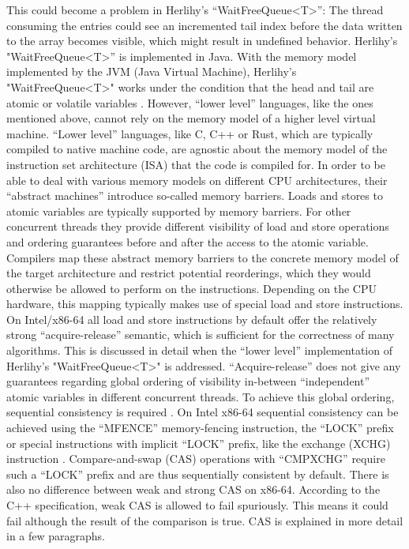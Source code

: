 This could become a problem in Herlihy’s “WaitFreeQueue<T>”: The thread consuming the entries could see an incremented tail index before the data written to the array becomes visible, which might result in undefined behavior.  \newline
Herlihy’s "WaitFreeQueue<T>” is implemented in Java. With the memory model implemented by the JVM (Java Virtual Machine), Herlihy’s "WaitFreeQueue<T>"  works under the condition that the head and tail are atomic or volatile variables \cite[63]{herlihy:art_of_mp}. However, “lower level” languages, like the ones mentioned above, cannot rely on the memory model of a higher level virtual machine. \newline
“Lower level” languages, like C, C++ or Rust, which are typically compiled to native machine code, are agnostic about the memory model of the instruction set architecture (ISA) that the code is compiled for. In order to be able to deal with various memory models on different CPU architectures, their “abstract machines” introduce so-called memory barriers. Loads and stores to atomic variables are typically supported by memory barriers. For other concurrent threads they provide different visibility of load and store operations and ordering guarantees before and after the access to the atomic variable. Compilers map these abstract memory barriers to the concrete memory model of the target architecture and restrict potential reorderings, which they would otherwise be allowed to perform on the instructions.  \newline
Depending on the CPU hardware, this mapping typically makes use of special load and store instructions. On Intel/x86-64 all load and store instructions by default offer the relatively strong “acquire-release” semantic, which is sufficient for the correctness of many algorithms. This is discussed in detail when the “lower level” implementation of Herlihy’s "WaitFreeQueue<T>" is addressed. “Acquire-release” does not give any guarantees regarding global ordering of visibility in-between “independent” atomic variables in different concurrent threads. To achieve this global ordering, sequential consistency is required \cite{cppref:memory_order}. On Intel x86-64 sequential consistency can be achieved using the “MFENCE” memory-fencing instruction, the “LOCK” prefix or special instructions with implicit “LOCK” prefix, like the exchange (XCHG) instruction \cite{intel:memory_order}. Compare-and-swap (CAS) operations with “CMPXCHG” require such a “LOCK” prefix and are thus sequentially consistent by default. There is also no difference between weak and strong CAS on x86-64. According to the C++ specification, weak CAS is allowed to fail spuriously. This means it could fail although the result of the comparison is true. CAS is explained in more detail in a few paragraphs.  \newline

